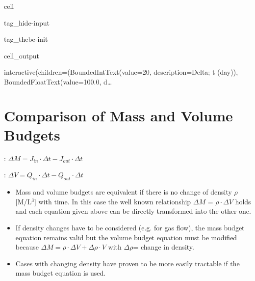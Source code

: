 \documentclass[letterpaper,10pt,english]{jupyterBook}
\begin{document}
\begin{sphinxuseclass}{cell}
\begin{sphinxuseclass}{tag_hide-input}
\begin{sphinxuseclass}{tag_thebe-init}\begin{sphinxVerbatimOutput}

\begin{sphinxuseclass}{cell_output}
\begin{sphinxVerbatim}[commandchars=\\\{\}]
interactive(children=(BoundedIntText(value=20, description=\PYGZsq{}\PYGZam{}Delta; t (day)\PYGZsq{}), BoundedFloatText(value=100.0, d…
\end{sphinxVerbatim}

\end{sphinxuseclass}\end{sphinxVerbatimOutput}

\end{sphinxuseclass}
\end{sphinxuseclass}
\end{sphinxuseclass}

\section{Comparison of Mass and Volume Budgets}
\label{\detokenize{content/background/03_basic_hydrogeology:comparison-of-mass-and-volume-budgets}}
\sphinxAtStartPar
{}:	\(\Delta M = J_{in} \cdot \Delta t - J_{out} \cdot \Delta t\)

\sphinxAtStartPar
{}:	\(\Delta V = Q_{in} \cdot \Delta t - Q_{out} \cdot \Delta t \)
\begin{itemize}
\item {} 
\sphinxAtStartPar
Mass and volume budgets are equivalent if there is no change of density \(\rho\) {[}M/L\(^3\){]} with time. In this case the well known relationship \(\Delta M\) = \(\rho \cdot \Delta V\) holds and each equation given above can be directly transformed into the other one.

\item {} 
\sphinxAtStartPar
If density changes have to be considered (e.g. for gas flow), the mass budget equation remains valid but the volume budget equation must be modified because \(\Delta M = \rho \cdot \Delta V + \Delta \rho \cdot V\) with \(\Delta \rho\)= change in density.

\item {} 
\sphinxAtStartPar
Cases with changing density have proven to be more easily tractable if the mass budget equation is used.

\end{itemize}
\end{document}
